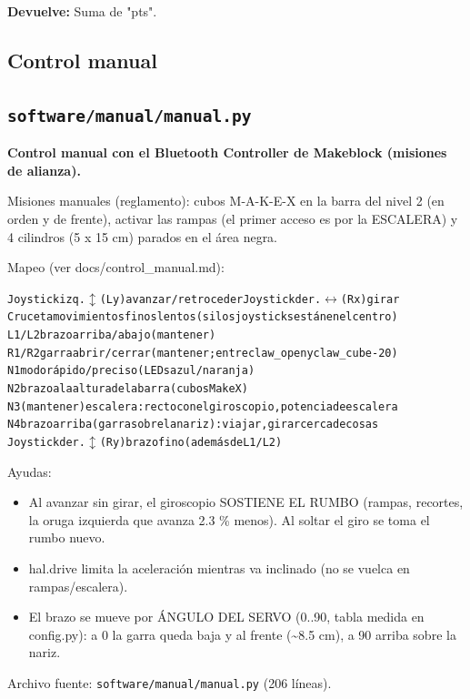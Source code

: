 \noindent\textbf{Devuelve:} Suma de "pts".\par

\subsection*{Control manual}
\subsection{\texttt{software/manual/manual.py}}\label{mod:manual}
\textbf{Control manual con el Bluetooth Controller de Makeblock (misiones de alianza).}

Misiones manuales (reglamento): cubos M-A-K-E-X en la barra del nivel 2 (en orden y de frente), activar las rampas (el primer acceso es por la ESCALERA) y 4 cilindros (5 x 15 cm) parados en el área negra.

Mapeo (ver docs/control\_manual.md):

{\small\begin{alltt}
Joystick izq. \(\updownarrow\) (Ly)  avanzar / retroceder      Joystick der. \(\leftrightarrow\) (Rx)  girar
Cruceta               movimientos finos lentos (si los joysticks están en el centro)
L1 / L2               brazo arriba / abajo (mantener)
R1 / R2               garra abrir / cerrar (mantener; entre claw\_open y claw\_cube - 20\textdegree{})
N1                    modo rápido / preciso (LEDs azul / naranja)
N2                    brazo a la altura de la barra (cubos MakeX)
N3 (mantener)         escalera: recto con el giroscopio, potencia de escalera
N4                    brazo arriba (garra sobre la nariz): viajar, girar cerca de cosas
Joystick der. \(\updownarrow\) (Ry)  brazo fino (además de L1/L2)
\end{alltt}}
Ayudas:

\begin{itemize}\setlength\itemsep{0pt}
\item Al avanzar sin girar, el giroscopio SOSTIENE EL RUMBO (rampas, recortes, la oruga izquierda que avanza 2.3 \% menos). Al soltar el giro se toma el rumbo nuevo.
\item hal.drive limita la aceleración mientras va inclinado (no se vuelca en rampas/escalera).
\item El brazo se mueve por ÁNGULO DEL SERVO (0..90\textdegree{}, tabla medida en config.py): a 0\textdegree{} la garra queda baja y al frente (\textasciitilde{}8.5 cm), a 90\textdegree{} arriba sobre la nariz.
\end{itemize}
\noindent Archivo fuente: \texttt{software/manual/manual.py} (206 l\'ineas).

